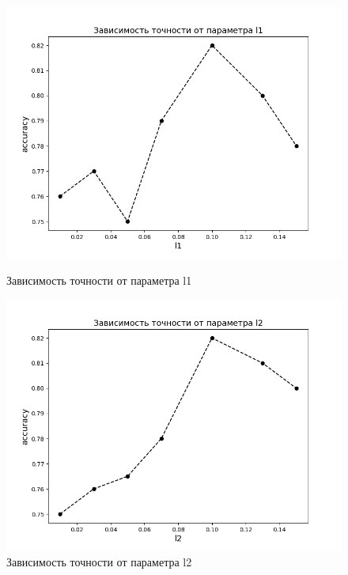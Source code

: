 \documentclass[14pt]{matmex-diploma-custom}
\begin{document}
\begin{figure}[!htb]
\includegraphics[width=\linewidth]{img/l1}
\caption{Зависимость точности от параметра l1}
\label{img:l1}
\endminipage
\hfill
{}
\includegraphics[width=\linewidth]{img/l2}
\caption{Зависимость точности от параметра l2}
\label{img:l2}
\endminipage
\end{figure}
\end{document}
